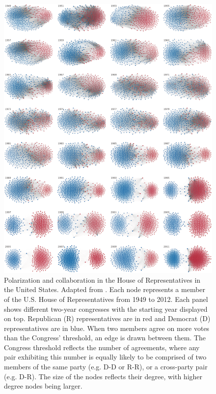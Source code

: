 \documentclass[11pt]{article}
\begin{document}
\begin{figure}[H]
   \centering
   \includegraphics[width=.6\linewidth]{../plots/references/us_parlament.png}
 \caption{Polarization and collaboration in the House of Representatives in the United States. Adapted from \protect{}. Each node represents a member of the U.S. House of Representatives from 1949 to 2012. Each panel shows different two-year congresses with the starting year displayed on top. Republican (R) representatives are in red and Democrat (D) representatives are in blue. When two members agree on more votes than the Congress' threshold, an edge is drawn between them. The Congress threshold reflects the number of agreements, where any pair exhibiting this number is equally likely to be comprised of two members of the same party (e.g. D-D or R-R), or a cross-party pair (e.g. D-R). The size of the nodes reflects their degree, with higher degree nodes being larger.}
 \label{fig:house_of_reps}
\end{figure}
\end{document}
